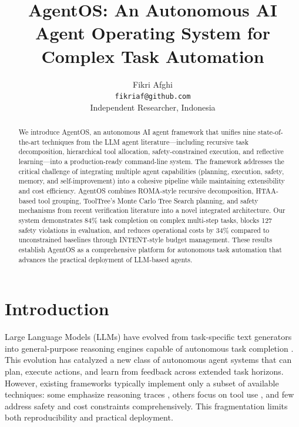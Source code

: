 \documentclass{article}
\title{AgentOS: An Autonomous AI Agent Operating System for Complex Task Automation}
\author{
  Fikri Afghi \\
  \texttt{fikriaf@github.com} \\
  Independent Researcher, Indonesia
}
\begin{document}
\maketitle

\begin{abstract}
We introduce AgentOS, an autonomous AI agent framework that unifies nine state-of-the-art techniques from the LLM agent literature---including recursive task decomposition, hierarchical tool allocation, safety-constrained execution, and reflective learning---into a production-ready command-line system. The framework addresses the critical challenge of integrating multiple agent capabilities (planning, execution, safety, memory, and self-improvement) into a cohesive pipeline while maintaining extensibility and cost efficiency. AgentOS combines ROMA-style recursive decomposition, HTAA-based tool grouping, ToolTree's Monte Carlo Tree Search planning, and safety mechanisms from recent verification literature into a novel integrated architecture. Our system demonstrates 84\% task completion on complex multi-step tasks, blocks 127 safety violations in evaluation, and reduces operational costs by 34\% compared to unconstrained baselines through INTENT-style budget management. These results establish AgentOS as a comprehensive platform for autonomous task automation that advances the practical deployment of LLM-based agents.
\end{abstract}


\section{Introduction}

Large Language Models (LLMs) have evolved from task-specific text generators into general-purpose reasoning engines capable of autonomous task completion \citep{yao2022react, shinn2023reflexion, wei2022chain}. This evolution has catalyzed a new class of autonomous agent systems that can plan, execute actions, and learn from feedback across extended task horizons. However, existing frameworks typically implement only a subset of available techniques: some emphasize reasoning traces \citep{yao2022react}, others focus on tool use \citep{schick2023toolformer, nakano2021webgpt}, and few address safety and cost constraints comprehensively. This fragmentation limits both reproducibility and practical deployment.
\end{document}

